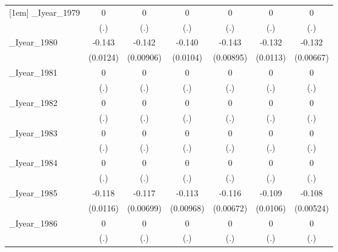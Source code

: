 \begin{table}[htbp]
\begin{tabular}{l*{6}{c}}
[1em]
\_Iyear\_1979&        0         &        0         &        0         &        0         &        0         &        0         \\
          &      (.)         &      (.)         &      (.)         &      (.)         &      (.)         &      (.)         \\
[1em]
\_Iyear\_1980&   -0.143\sym{***}&   -0.142\sym{***}&   -0.140\sym{***}&   -0.143\sym{***}&   -0.132\sym{***}&   -0.132\sym{***}\\
          & (0.0124)         &(0.00906)         & (0.0104)         &(0.00895)         & (0.0113)         &(0.00667)         \\
[1em]
\_Iyear\_1981&        0         &        0         &        0         &        0         &        0         &        0         \\
          &      (.)         &      (.)         &      (.)         &      (.)         &      (.)         &      (.)         \\
[1em]
\_Iyear\_1982&        0         &        0         &        0         &        0         &        0         &        0         \\
          &      (.)         &      (.)         &      (.)         &      (.)         &      (.)         &      (.)         \\
[1em]
\_Iyear\_1983&        0         &        0         &        0         &        0         &        0         &        0         \\
          &      (.)         &      (.)         &      (.)         &      (.)         &      (.)         &      (.)         \\
[1em]
\_Iyear\_1984&        0         &        0         &        0         &        0         &        0         &        0         \\
          &      (.)         &      (.)         &      (.)         &      (.)         &      (.)         &      (.)         \\
[1em]
\_Iyear\_1985&   -0.118\sym{***}&   -0.117\sym{***}&   -0.113\sym{***}&   -0.116\sym{***}&   -0.109\sym{***}&   -0.108\sym{***}\\
          & (0.0116)         &(0.00699)         &(0.00968)         &(0.00672)         & (0.0106)         &(0.00524)         \\
[1em]
\_Iyear\_1986&        0         &        0         &        0         &        0         &        0         &        0         \\
          &      (.)         &      (.)         &      (.)         &      (.)         &      (.)         &      (.)         \\

\end{tabular}
\end{table}
